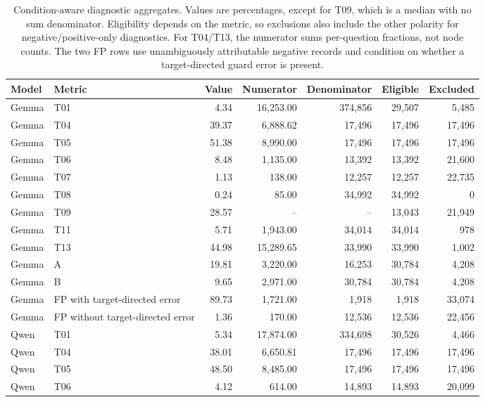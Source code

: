 \begin{table}[t]
\centering
\caption{Condition-aware diagnostic aggregates. Values are percentages, except for T09, which is a median with no sum denominator. Eligibility depends on the metric, so exclusions also include the other polarity for negative/positive-only diagnostics. For T04/T13, the numerator sums per-question fractions, not node counts. The two FP rows use unambiguously attributable negative records and condition on whether a target-directed guard error is present.}
\label{tab:diagnostic-populations}
\scriptsize
\setlength{\tabcolsep}{3pt}
\begin{tabular}{llrrrrr}
\toprule
Model & Metric & Value & Numerator & Denominator & Eligible & Excluded \\
\midrule
Gemma & T01 & 4.34 & 16,253.00 & 374,856 & 29,507 & 5,485 \\
Gemma & T04 & 39.37 & 6,888.62 & 17,496 & 17,496 & 17,496 \\
Gemma & T05 & 51.38 & 8,990.00 & 17,496 & 17,496 & 17,496 \\
Gemma & T06 & 8.48 & 1,135.00 & 13,392 & 13,392 & 21,600 \\
Gemma & T07 & 1.13 & 138.00 & 12,257 & 12,257 & 22,735 \\
Gemma & T08 & 0.24 & 85.00 & 34,992 & 34,992 & 0 \\
Gemma & T09 & 28.57 & -- & -- & 13,043 & 21,949 \\
Gemma & T11 & 5.71 & 1,943.00 & 34,014 & 34,014 & 978 \\
Gemma & T13 & 44.98 & 15,289.65 & 33,990 & 33,990 & 1,002 \\
Gemma & A & 19.81 & 3,220.00 & 16,253 & 30,784 & 4,208 \\
Gemma & B & 9.65 & 2,971.00 & 30,784 & 30,784 & 4,208 \\
Gemma & FP with target-directed error & 89.73 & 1,721.00 & 1,918 & 1,918 & 33,074 \\
Gemma & FP without target-directed error & 1.36 & 170.00 & 12,536 & 12,536 & 22,456 \\
\midrule
Qwen & T01 & 5.34 & 17,874.00 & 334,698 & 30,526 & 4,466 \\
Qwen & T04 & 38.01 & 6,650.81 & 17,496 & 17,496 & 17,496 \\
Qwen & T05 & 48.50 & 8,485.00 & 17,496 & 17,496 & 17,496 \\
Qwen & T06 & 4.12 & 614.00 & 14,893 & 14,893 & 20,099 \\

\end{tabular}
\end{table}
